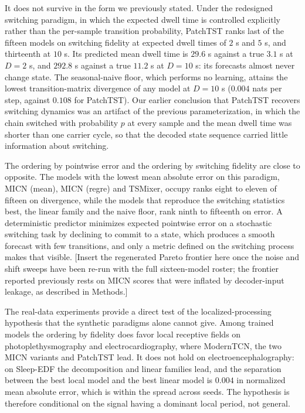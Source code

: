 It does not survive in the form we previously stated. Under the redesigned switching paradigm,
in which the expected dwell time is controlled explicitly rather than the per-sample transition
probability, PatchTST ranks last of the fifteen models on switching fidelity at expected dwell
times of $2$ s and $5$ s, and thirteenth at $10$ s. Its predicted mean dwell time is $29.6$ s
against a true $3.1$ s at $D = 2$ s, and $292.8$ s against a true $11.2$ s at $D = 10$ s: its
forecasts almost never change state. The seasonal-naive floor, which performs no learning,
attains the lowest transition-matrix divergence of any model at $D = 10$ s
($0.004$ nats per step, against $0.108$ for PatchTST). Our earlier conclusion that PatchTST
recovers switching dynamics was an artifact of the previous parameterization, in which the chain
switched with probability $p$ at every sample and the mean dwell time was shorter than one
carrier cycle, so that the decoded state sequence carried little information about switching.

The ordering by pointwise error and the ordering by switching fidelity are close to opposite.
The models with the lowest mean absolute error on this paradigm, MICN (mean), MICN (regre) and
TSMixer, occupy ranks eight to eleven of fifteen on divergence, while the models that reproduce
the switching statistics best, the linear family and the naive floor, rank ninth to fifteenth on
error. A deterministic predictor minimizes expected pointwise error on a stochastic switching
task by declining to commit to a state, which produces a smooth forecast with few transitions,
and only a metric defined on the switching process makes that visible.
[Insert the regenerated Pareto frontier here once the noise and shift sweeps have been re-run
with the full sixteen-model roster; the frontier reported previously rests on MICN scores that
were inflated by decoder-input leakage, as described in Methods.]

The real-data experiments provide a direct test of the localized-processing hypothesis that the
synthetic paradigms alone cannot give. Among trained models the ordering by fidelity does favor
local receptive fields on photoplethysmography and electrocardiography, where ModernTCN, the two
MICN variants and PatchTST lead. It does not hold on electroencephalography: on Sleep-EDF the
decomposition and linear families lead, and the separation between the best local model and the
best linear model is $0.004$ in normalized mean absolute error, which is within the spread across
seeds. The hypothesis is therefore conditional on the signal having a dominant local period, not
general.


